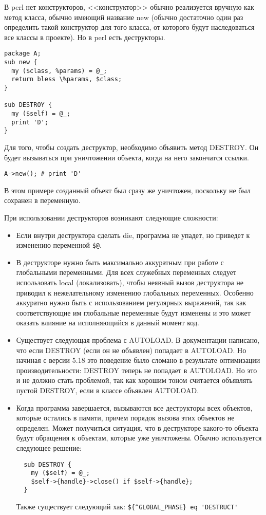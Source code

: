 В perl нет конструкторов, <<конструктор>> обычно реализуется вручную как метод класса, обычно имеющий название new (обычно достаточно один раз определить такой конструктор для того класса, от которого будут наследоваться все классы в проекте). Но в perl есть деструкторы.
\begin{verbatim}
package A;
sub new {
  my ($class, %params) = @_;
  return bless \%params, $class;
}

sub DESTROY {
  my ($self) = @_;
  print 'D';
}
\end{verbatim}
Для того, чтобы создать деструктор, необходимо объявить метод DESTROY. Он будет вызываться при уничтожении объекта, когда на него закончатся ссылки.
\begin{verbatim}
A->new(); # print 'D'
\end{verbatim}
В этом примере созданный объект был сразу же уничтожен, поскольку не был сохранен в переменную.

При использовании деструкторов возникают следующие сложности:
\begin{itemize}
  \item Если внутри деструктора сделать die, программа не упадет, но приведет к изменению переменной \verb|$@|.

  \item В деструкторе нужно быть максимально аккуратным при работе с глобальными переменными. Для всех служебных переменных следует использовать local (локализовать), чтобы неявный вызов деструктора не приводил к нежелательному изменению глобальных переменных. Особенно аккуратно нужно быть с использованием регулярных выражений, так как соответствующие им глобальные переменные будут изменены и это может оказать влияние на исполняющийся в данный момент код.

  \item Существует следующая проблема с AUTOLOAD. В документации написано, что если DESTROY (если он не объявлен) попадает в AUTOLOAD. Но начиная с версии 5.18 это поведение было сломано в результате оптимизации производительности: DESTROY теперь не попадает в AUTOLOAD. Но это и не должно стать проблемой, так как хорошим тоном считается объявлять пустой DESTROY, если в классе объявлен AUTOLOAD.

  \item Когда программа завершается, вызываются все деструкторы всех объектов, которые остались в памяти, причем порядок вызова этих объектов не определен. Может получиться ситуация, что в деструкторе какого-то объекта будут обращения к объектам, которые уже уничтожены. Обычно используется следующее решение:
\begin{verbatim}
  sub DESTROY {
    my ($self) = @_;
    $self->{handle}->close() if $self->{handle};
  }
\end{verbatim}
  Также существует следующий хак: \verb|${^GLOBAL_PHASE} eq 'DESTRUCT'|
\end{itemize}

